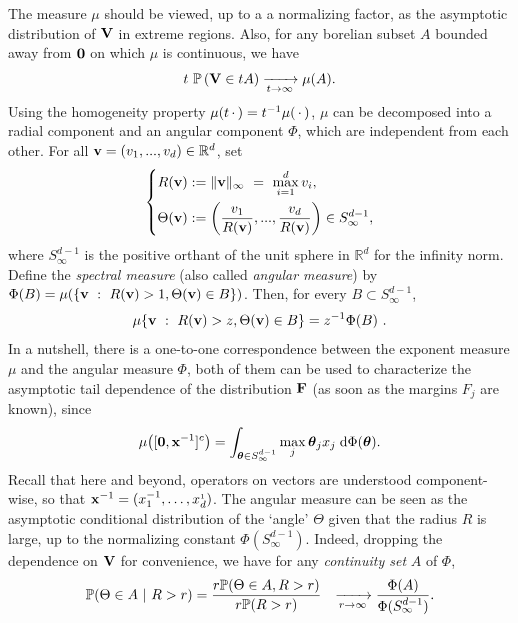The measure $\mu$ should be viewed, up to a a normalizing factor, as
the asymptotic distribution of $\mathbf V$ in extreme regions. Also, for any borelian subset $A$ bounded away from $\mathbf 0$ on which $\mu$ is continuous, we have 
\begin{align}
\label{jmva:eq:regularVariation}
t~ \mathbb{P}\left( \mathbf V \in t A\right) \xrightarrow[t\to\infty]{}\mu(A).     
\end{align}
Using the homogeneity property $\mu(t\,\cdot\,) =
t^{-1}\mu(\,\cdot\,)$, $\mu$  can be decomposed into a radial component and an angular component $\Phi$, which are independent from each other.
For all $\mathbf v = (v_1,...,v_d) \in \mathbb{R}^d$, set
\begin{align}\label{jmva:eq:pseudoPolar_change}
  \left\{ \begin{aligned}
R(\mathbf v)&:= \|\mathbf v\|_\infty ~=~ \max_{i=1}^d v_i, \\
\Theta (\mathbf v) &:= \left( \frac{v_1}{R(\mathbf v)},..., \frac{v_d}{R(\mathbf v)} \right)
\in S_\infty^{d-1},     
  \end{aligned}\right.
\end{align}
where $S_\infty^{d-1}$ is the positive orthant of  the unit sphere in $\mathbb{R}^d$ for the infinity norm.
Define the \emph{ spectral measure} (also called \emph{angular measure}) by $\Phi(B)= \mu (\{\mathbf v~:~R(\mathbf v)>1 ,
\Theta(\mathbf v) \in B \})$. Then, for every $B
\subset S_\infty^{d-1}$, 
\begin{align}
\label{jmva:mu-phi}
\mu\{\mathbf v~:~R(\mathbf v)>z, \Theta(\mathbf v) \in B \} = z^{-1} \Phi (B)~. 
\end{align}
In a nutshell,  there
is a one-to-one correspondence between the exponent measure $\mu$ and the angular measure
$\Phi$, both of them can be used to characterize the asymptotic tail
dependence of the distribution $\mathbf F$ (as
soon as the  margins $F_j$ are known), since   %
\begin{align}\label{jmva:eq:integratePhiLambda}
  \mu \big( [\mathbf 0,\mathbf{x}^{-1}]^c \big) =  \int_{\boldsymbol{\theta} \in S_{\infty}^{d-1}}   \max_j{\boldsymbol{\theta}_j x_j} \;\mathrm{d} \Phi(\boldsymbol{\theta}).
\end{align}
Recall that here and beyond, operators on vectors are understood component-wise, so that $\mathbf x^{-1}=(x_1^{-1},\ldots,x_d^{_1})$.
The angular measure can be seen as the asymptotic conditional distribution of the
`angle' $\Theta$ given that the radius $R$ is large, up to the
normalizing constant $\Phi(S_\infty^{d-1})$. Indeed, dropping
the dependence on $\mathbf V$ for convenience, we have for any
\emph{continuity set} $A$ of $\Phi$, 
\begin{align}
  \label{jmva:eq:limitConditAngle}
\begin{aligned}
  \mathbb{P}(\Theta \in A ~|~R>r ) &= 
\frac{r  \mathbb{P}(\Theta \in A , R>r ) }{r\mathbb{P}(R>r)} 
& \xrightarrow[r\to \infty]{} \frac{\Phi(A)}{\Phi(S_\infty^{d-1})} .
\end{aligned}  
\end{align}

